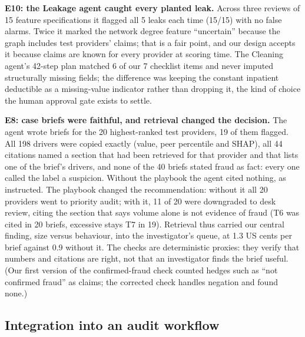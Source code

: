 \documentclass[11pt,a4paper]{article}
\begin{document}
\textbf{E10: the Leakage agent caught every planted leak.} Across three reviews of 15 feature specifications it flagged all 5 leaks each time (15/15) with no false alarms. Twice it marked the network degree feature ``uncertain'' because the graph includes test providers' claims; that is a fair point, and our design accepts it because claims are known for every provider at scoring time. The Cleaning agent's 42-step plan matched 6 of our 7 checklist items and never imputed structurally missing fields; the difference was keeping the constant inpatient deductible as a missing-value indicator rather than dropping it, the kind of choice the human approval gate exists to settle.

\textbf{E8: case briefs were faithful, and retrieval changed the decision.} The agent wrote briefs for the 20 highest-ranked test providers, 19 of them flagged. All 198 drivers were copied exactly (value, peer percentile and SHAP), all 44 citations named a section that had been retrieved for that provider and that lists one of the brief's drivers, and none of the 40 briefs stated fraud as fact: every one called the label a suspicion. Without the playbook the agent cited nothing, as instructed. The playbook changed the recommendation: without it all 20 providers went to priority audit; with it, 11 of 20 were downgraded to desk review, citing the section that says volume alone is not evidence of fraud (T6 was cited in 20 briefs, excessive stays T7 in 19). Retrieval thus carried our central finding, size versus behaviour, into the investigator's queue, at 1.3 US cents per brief against 0.9 without it. The checks are deterministic proxies: they verify that numbers and citations are right, not that an investigator finds the brief useful. (Our first version of the confirmed-fraud check counted hedges such as ``not confirmed fraud'' as claims; the corrected check handles negation and found none.)

\subsection{Integration into an audit workflow}
\end{document}
